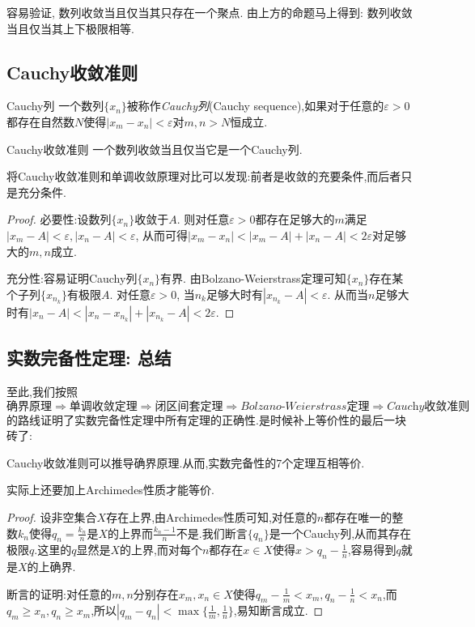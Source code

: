容易验证, 数列收敛当且仅当其只存在一个聚点. 由上方的命题马上得到: 数列收敛当且仅当其上下极限相等. 

\subsection{Cauchy收敛准则}

\begin{definition}{Cauchy列}
	一个数列$\{ x_n \}$被称作\textit{Cauchy列}(Cauchy sequence),如果对于任意的$\varepsilon >0$都存在自然数$N$使得$|x_m-x_n|<\varepsilon$对$m,n>N$恒成立.
\end{definition}

\begin{theorem}{Cauchy收敛准则}
	一个数列收敛当且仅当它是一个Cauchy列.
\end{theorem}
\begin{remark}
	将Cauchy收敛准则和单调收敛原理对比可以发现:前者是收敛的充要条件,而后者只是充分条件.
\end{remark}
\begin{proof}
	必要性:设数列$\{ x_n \}$收敛于$A$. 则对任意$\varepsilon >0$都存在足够大的$m$满足$|x_m-A|<\varepsilon ,|x_n-A|<\varepsilon$, 从而可得$|x_m-x_n|<|x_m-A|+|x_n-A|<2\varepsilon$对足够大的$m,n$成立. 
	
	充分性:容易证明Cauchy列$\{ x_n \}$有界. 由Bolzano-Weierstrass定理可知$\{ x_n \}$存在某个子列$\{ x_{n_k} \}$有极限$A$. 对任意$\varepsilon >0$, 当$n_k$足够大时有$|x_{n_k} - A|<\varepsilon$. 从而当$n$足够大时有$|x_n-A|<|x_n-x_{n_k}|+|x_{n_k}-A|<2\varepsilon$. 
\end{proof}

\subsection{实数完备性定理: 总结}

至此,我们按照$$\textit{确界原理} \Rightarrow \textit{单调收敛定理} \Rightarrow \textit{闭区间套定理} \Rightarrow \textit{Bolzano-Weierstrass定理} \Rightarrow \textit{Cauchy收敛准则}$$的路线证明了实数完备性定理中所有定理的正确性.是时候补上等价性的最后一块砖了:

\begin{proposition}{}
	Cauchy收敛准则可以推导确界原理.从而,实数完备性的7个定理互相等价.
\end{proposition}
\begin{remark}
	实际上还要加上Archimedes性质才能等价. 
\end{remark}
\begin{proof}
	设非空集合$X$存在上界,由Archimedes性质可知,对任意的$n$都存在唯一的整数$k_n$使得$q_n=\frac{k_n}{n}$是$X$的上界而$\frac{k_n-1}{n}$不是.我们断言$\{ q_n \}$是一个Cauchy列,从而其存在极限$q$.这里的$q$显然是$X$的上界,而对每个$n$都存在$x \in X$使得$x>q_n-\frac{1}{n}$,容易得到$q$就是$X$的上确界.
	
	断言的证明:对任意的$m,n$分别存在$x_m,x_n \in X$使得$q_m-\frac{1}{m} < x_m,q_n-\frac{1}{n} < x_n$,而$q_m \geq x_n,q_n \geq x_m$,所以$|q_m-q_n|<\max \{ \frac{1}{m},\frac{1}{n} \}$,易知断言成立.
\end{proof}


